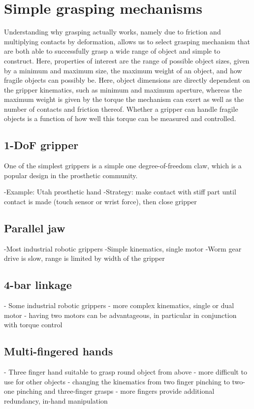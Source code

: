\section{Simple grasping mechanisms}
Understanding why grasping actually works, namely due to friction and multiplying contacts by deformation, allows us to select grasping mechanism that are both able to successfully grasp a wide range of object and simple to construct. Here, properties of interest are the range of possible object sizes, given by a minimum and maximum size, the maximum weight of an object, and how fragile objects can possibly be. Here, object dimensions are directly dependent on the gripper kinematics, such as minimum and maximum aperture, whereas the maximum weight is given by the torque the mechanism can exert as well as the number of contacts and friction thereof. Whether a gripper can handle fragile objects is a function of how well this torque can be measured and controlled. 

\subsection{1-DoF gripper}
One of the simplest grippers is a simple one degree-of-freedom claw, which is a popular design in the prosthetic community. 

-Example: Utah prosthetic hand
-Strategy: make contact with stiff part until contact is made (touch sensor or wrist force), then close gripper

\subsection{Parallel jaw}
-Most industrial robotic grippers
-Simple kinematics, single motor
-Worm gear drive is slow, range is limited by width of the gripper

\subsection{4-bar linkage}
- Some industrial robotic grippers
- more complex kinematics, single or dual motor
- having two motors can be advantageous, in particular in conjunction with torque control

\subsection{Multi-fingered hands}
- Three finger hand suitable to grasp round object from above
- more difficult to use for other objects
- changing the kinematics from two finger pinching to two-one pinching and three-finger grasps
- more fingers provide additional redundancy, in-hand manipulation

